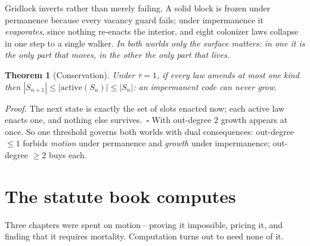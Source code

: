 \documentclass[10pt]{article}
\newtheorem{theorem}{Theorem}
\theoremstyle{definition}
\theoremstyle{remark}
\begin{document}
Gridlock inverts rather than merely failing. A solid block is frozen under
permanence because every vacancy guard fails; under impermanence it
\emph{evaporates}, since nothing re-enacts the interior, and eight colonizer
laws collapse in one step to a single walker. \emph{In both worlds only the
surface matters: in one it is the only part that moves, in the other the only
part that lives.}
\begin{theorem}[Conservation]
Under $\tau=1$, if every law amends at most one kind then
$|S_{n+1}|\le|\mathrm{active}(S_n)|\le|S_n|$: an impermanent code can never
grow.
\end{theorem}
\emph{Proof.} The next state is exactly the set of slots enacted now; each
active law enacts one, and nothing else survives.~$\square$ With out-degree $2$
growth appears at once. So one threshold governs both worlds with dual
consequences: out-degree $\le1$ forbids \emph{motion} under permanence and
\emph{growth} under impermanence; out-degree $\ge2$ buys each.

\section{The statute book computes}
Three chapters were spent on motion---proving it impossible, pricing it, and
finding that it requires mortality. Computation turns out to need none of it.
\end{document}

